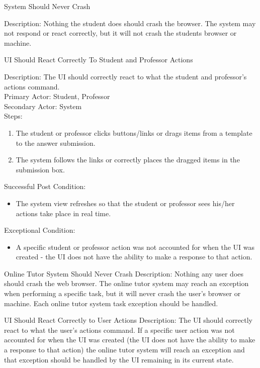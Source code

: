     \begin{section}{System Should Never Crash}
    
    Description: Nothing the student does should crash the browser. The system may not respond or react correctly, but it will not crash the students browser or machine.
    \end{section}
    
    \begin{section}{ UI Should React Correctly To Student and Professor Actions}
    
    Description: The UI should correctly react to what the student and professor’s actions command.\\
    Primary Actor: Student, Professor\\
    Secondary Actor: System\\
    Steps:
        \begin{enumerate}
            \item The student or professor clicks buttons/links or drags items from a template to the answer submission.
            \item The system follows the links or correctly places the dragged items in the submission box.
            \end{enumerate}
    Successful Post Condition: 
        \begin{itemize}
            \item The system view refreshes so that the student or professor sees his/her actions take place in real time.
        \end{itemize}
    Exceptional Condition:
        \begin{itemize}
            \item A specific student or professor action was not accounted for when the UI was created - the UI does not have the ability to make a response to that action.
        \end{itemize}
    \end{section}
    
    \begin{section}{Online Tutor System Should Never Crash}
        Description: Nothing any user does should crash the web browser.  The online tutor system may 
        reach an exception when performing a specific task, but it will never crash the user’s browser 
        or machine.  Each online tutor system task exception should be handled.
    \end{section}
    
    \begin{section}{UI Should React Correctly to User Actions}
        Description: The UI should correctly react to what the user’s actions command.  
        If a specific user action was not accounted for when the UI was created (the UI does not have the 
        ability to make a response to that action) the online tutor system will reach an exception and that 
        exception should be handled by the UI remaining in its current state.
    \end{section}
    
